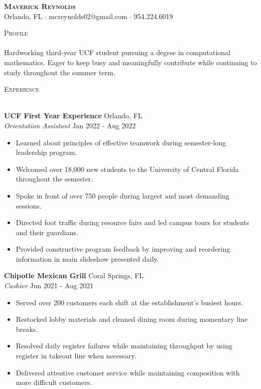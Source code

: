 \documentclass[letterpaper]{article}
\newcommand{\lineunder} {
    \vspace*{-8pt} \\
    \hspace*{-18pt} \hrulefill \\
}
\newcommand{\header} [1] {
    {\hspace*{-18pt}\vspace*{12pt} \large\textsc{#1}}
    \vspace*{-12pt} \lineunder
}
\begin{document}
\vspace*{-25pt}
    

\vspace*{-10pt}
\begin{center}
	{\Huge \scshape \textbf {Maverick Reynolds}}\\
	Orlando, FL $\cdot$ mcreynolds02@gmail.com $\cdot$ 954.224.6019\\
\end{center}


\header{Profile}
\vspace{1mm}
Hardworking third-year UCF student pursuing a degree in computational mathematics. Eager to keep busy and meaningfully contribute while continuing to study throughout the summer term.\\
\vspace{3mm}


\header{Experience}
\vspace{1mm}

\textbf{UCF First Year Experience} \hfill Orlando, FL\\
\textit{Orientation Assistant} \hfill Jan 2022 - Aug 2022\\
\vspace{-1mm}
\begin{itemize} \itemsep 1pt
	\item Learned about principles of effective teamwork during semester-long leadership program.
	\item Welcomed over 18,000 new students to the University of Central Florida throughout the semester.
	\item Spoke in front of over 750 people during largest and most demanding sessions.
	\item Directed foot traffic during resource fairs and led campus tours for students and their guardians.
	\item Provided constructive program feedback by improving and reordering information in main slideshow presented daily.
\end{itemize}

\textbf{Chipotle Mexican Grill} \hfill Coral Springs, FL\\
\textit{Cashier} \hfill Jun 2021 - Aug 2021\\
\vspace{-1mm}
\begin{itemize} \itemsep 1pt
	\item Served over 200 customers each shift at the establishment's busiest hours.
	\item Restocked lobby materials and cleaned dining room during momentary line breaks.
	\item Resolved daily register failures while maintaining throughput by using register in takeout line when necessary.
	\item Delivered attentive customer service while maintaining composition with more difficult customers.
\end{itemize}
\vspace{1mm}
\end{document}
